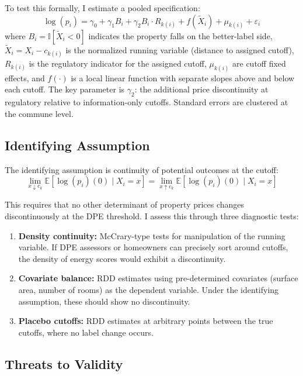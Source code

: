 \documentclass[12pt]{article}
\newcommand{\E}{\mathbb{E}}
\newcommand{\ind}{\mathbb{I}}
\begin{document}
To test this formally, I estimate a pooled specification:
\begin{equation}
    \log(p_i) = \gamma_0 + \gamma_1 B_i + \gamma_2 B_i \cdot R_{k(i)} + f(\tilde{X}_i) + \mu_{k(i)} + \varepsilon_i
    \label{eq:pooled}
\end{equation}
where $B_i = \ind[\tilde{X}_i < 0]$ indicates the property falls on the better-label side, $\tilde{X}_i = X_i - c_{k(i)}$ is the normalized running variable (distance to assigned cutoff), $R_{k(i)}$ is the regulatory indicator for the assigned cutoff, $\mu_{k(i)}$ are cutoff fixed effects, and $f(\cdot)$ is a local linear function with separate slopes above and below each cutoff. The key parameter is $\gamma_2$: the additional price discontinuity at regulatory relative to information-only cutoffs. Standard errors are clustered at the commune level.

\subsection{Identifying Assumption}

The identifying assumption is continuity of potential outcomes at the cutoff:
\begin{equation}
    \lim_{x \downarrow c_k} \E[\log(p_i)(0) \mid X_i = x] = \lim_{x \uparrow c_k} \E[\log(p_i)(0) \mid X_i = x]
\end{equation}

This requires that no other determinant of property prices changes discontinuously at the DPE threshold. I assess this through three diagnostic tests:

\begin{enumerate}
    \item \textbf{Density continuity:} McCrary-type tests \citep{mccrary2008manipulation, cattaneo2020rdrobust} for manipulation of the running variable. If DPE assessors or homeowners can precisely sort around cutoffs, the density of energy scores would exhibit a discontinuity.
    \item \textbf{Covariate balance:} RDD estimates using pre-determined covariates (surface area, number of rooms) as the dependent variable. Under the identifying assumption, these should show no discontinuity.
    \item \textbf{Placebo cutoffs:} RDD estimates at arbitrary points between the true cutoffs, where no label change occurs.
\end{enumerate}

\subsection{Threats to Validity}
\end{document}
